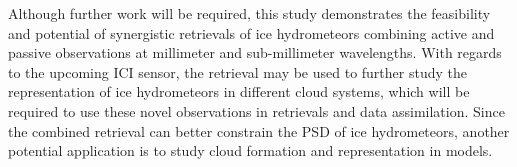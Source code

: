 \documentclass[journal abbreviation, manuscript]{copernicus}
\begin{document}
Although further work will be required, this study demonstrates the feasibility
and potential of synergistic retrievals of ice hydrometeors combining active
and passive observations at millimeter and sub-millimeter wavelengths. With
regards to the upcoming ICI sensor, the retrieval may be used to further study
the representation of ice hydrometeors in different cloud systems, which will be
required to use these novel observations in retrievals and data assimilation.
Since the combined retrieval can better constrain the PSD of ice hydrometeors,
another potential application is to study cloud formation and representation in
models.






\dataavailability{} %



\appendix



\noappendix       %




\appendixfigures  %

\appendixtables   %
\end{document}
